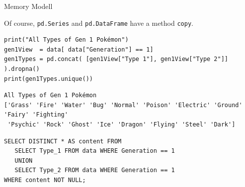 \begin{frame}{Memory Modell}
\vspace{6pt}

Of course, \texttt{pd.Series} and \texttt{pd.DataFrame} have a method \texttt{copy}.
%
\end{frame}


\begin{frame}[fragile]
%
\begin{codebox}
\begin{verbatim}
print("All Types of Gen 1 Pokémon")
gen1View  = data[ data["Generation"] == 1]
gen1Types = pd.concat( [gen1View["Type 1"], gen1View["Type 2"]] ).dropna()
print(gen1Types.unique())
\end{verbatim}
\end{codebox}
%
\begin{cmdbox}
\begin{verbatim}
All Types of Gen 1 Pokémon
['Grass' 'Fire' 'Water' 'Bug' 'Normal' 'Poison' 'Electric' 'Ground' 'Fairy' 'Fighting'
 'Psychic' 'Rock' 'Ghost' 'Ice' 'Dragon' 'Flying' 'Steel' 'Dark']
\end{verbatim}
\end{cmdbox}
%
\begin{hintbox}
\scriptsize
\begin{verbatim}
SELECT DISTINCT * AS content FROM
   SELECT Type_1 FROM data WHERE Generation == 1
   UNION
   SELECT Type_2 FROM data WHERE Generation == 1
WHERE content NOT NULL;
\end{verbatim}
\end{hintbox}
%
\end{frame}


